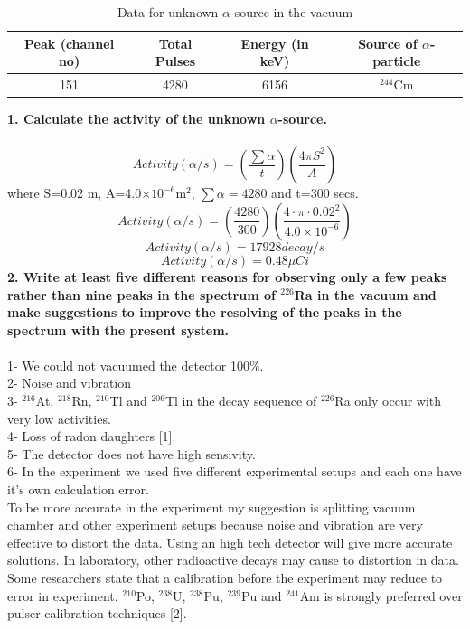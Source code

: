 \documentclass[a4paper,12pt]{article}
\begin{document}
\begin{table}[h!]
	\begin{center}
		\begin{tabular}{|c|c|c|c|}
	\hline Peak (channel no) & Total Pulses & Energy (in keV) & Source of $\alpha$-particle \\ 
	\hline 151 & 4280 & 6156 & $^{244}$Cm \\ 
	\hline 
	\end{tabular}
	\caption{Data for unknown $\alpha$-source in the vacuum} 
	\end{center}
\end{table}
\newpage
\textbf{1. Calculate the activity of the unknown $\alpha$-source.}\\\\
\begin{equation}
Activity(\alpha/s)=(\frac{\sum\alpha}{t})(\frac{4\pi S^{2}}{A})
\end{equation}
where S=0.02 m, A=4.0$\times 10^{-6}$m$^{2}$, $\sum \alpha = 4280$ and t=300 secs.
\begin{equation}
Activity(\alpha/s)=(\frac{4280}{300})(\frac{4\cdot \pi \cdot0.02^{2}}{4.0\times 10^{-6}})
\end{equation}
\begin{equation}
Activity(\alpha/s)=17928 decay/s
\end{equation}
\begin{equation}
Activity(\alpha/s)=0.48 \mu Ci
\end{equation}
\textbf{2. Write at least five different reasons for observing only a few peaks rather than nine peaks in the spectrum of $^{226}$Ra in the vacuum and make suggestions to improve the resolving of the peaks in the spectrum with the present system.}\\\\
1- We could not vacuumed the detector 100\%.\\
2- Noise and vibration\\
3- $^{216}$At, $^{218}$Rn, $^{210}$Tl and $^{206}$Tl in the decay sequence of $^{226}$Ra only occur with very low activities.\\
4- Loss of radon daughters [1].\\
5- The detector does not have high sensivity.\\
6- In the experiment we used five different experimental setups and each one have it's own calculation error.\\
To be more accurate in the experiment my suggestion is splitting vacuum chamber and other experiment setups because noise and vibration are very effective to distort the data. Using an high tech detector will give more accurate solutions. In laboratory, other radioactive decays may cause to distortion in data. Some researchers state that a calibration before the experiment may reduce to error in experiment. $^{210}$Po, $^{238}$U, $^{238}$Pu, $^{239}$Pu and $^{241}$Am  is strongly preferred over pulser-calibration techniques [2].\\\\
\end{document}
